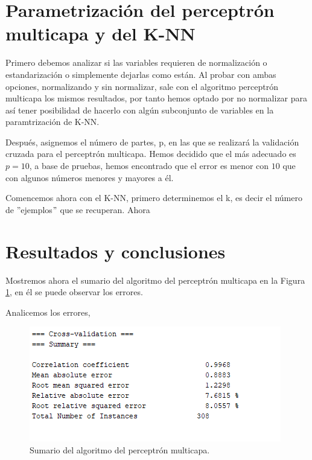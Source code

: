 \documentclass[a4paper, 11pt, twoside, openany, onecolumn, final]{memoir}
\begin{document}
	\section{Parametrización del perceptrón multicapa y del K-NN}
	Primero debemos analizar si las variables requieren de normalización o estandarización o simplemente dejarlas como están. Al probar con ambas opciones, normalizando y sin normalizar, sale con el algoritmo perceptrón multicapa los mismos resultados, por tanto hemos optado por no normalizar para así tener posibilidad de hacerlo con algún subconjunto de variables en la paramtrización de K-NN.
	
	Después, asignemos el número de partes, p, en las que se realizará la validación cruzada para el perceptrón multicapa. Hemos decidido que el más adecuado es $p=10$, a base de pruebas, hemos encontrado que el error es menor con $10$ que con algunos números menores y mayores a él.
	
	Comencemos ahora con el K-NN, primero determinemos el k, es decir el número de ''ejemplos$"$ que se recuperan. Ahora 
	
	\section{Resultados y conclusiones}
	Mostremos ahora el sumario del algoritmo del perceptrón multicapa en la Figura \ref{SumarioPerceptron}, en él se puede observar los errores.
	
	Analicemos los errores,
	\begin{figure}
  		\centering
   	\includegraphics{Imagenes/SumarioPerceptron}
  		\caption{Sumario del algoritmo del perceptrón multicapa.}
  		\label{SumarioPerceptron}
	\end{figure}
	 
\end{document}
